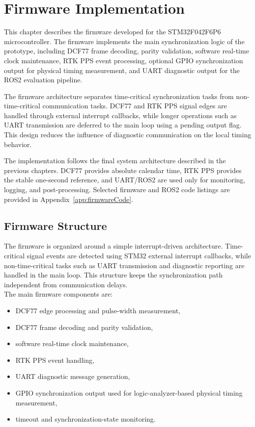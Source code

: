 
\chapter{Firmware Implementation\label{chap:firmwareImplementation}}

This chapter describes the firmware developed for the STM32F042F6P6 microcontroller. The firmware implements the main synchronization logic of the prototype, including DCF77 frame decoding, parity validation, software real-time clock maintenance, RTK PPS event processing, optional GPIO synchronization output for physical timing measurement, and UART diagnostic output for the ROS2 evaluation pipeline.

The firmware architecture separates time-critical synchronization tasks from non-time-critical communication tasks. DCF77 and RTK PPS signal edges are handled through external interrupt callbacks, while longer operations such as UART transmission are deferred to the main loop using a pending output flag. This design reduces the influence of diagnostic communication on the local timing behavior.

The implementation follows the final system architecture described in the previous chapters. DCF77 provides absolute calendar time, RTK PPS provides the stable one-second reference, and UART/ROS2 are used only for monitoring, logging, and post-processing. Selected firmware and ROS2 code listings are provided in Appendix~\ref{app:firmwareCode}.

\section{Firmware Structure}

The firmware is organized around a simple interrupt-driven architecture. Time-critical signal events are detected using STM32 external interrupt callbacks, while non-time-critical tasks such as UART transmission and diagnostic reporting are handled in the main loop. This structure keeps the synchronization path independent from communication delays.
\\
The main firmware components are:
\begin{itemize}
    \item DCF77 edge processing and pulse-width measurement,
    \item DCF77 frame decoding and parity validation,
    \item software real-time clock maintenance,
    \item RTK PPS event handling,
    \item UART diagnostic message generation,
    \item GPIO synchronization output used for logic-analyzer-based physical timing measurement,
    \item timeout and synchronization-state monitoring.
\end{itemize}

